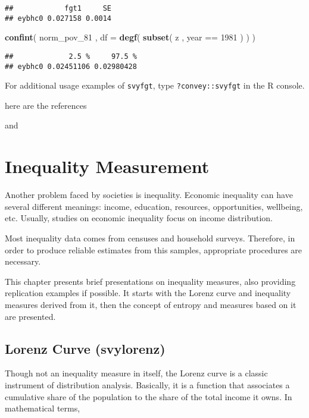 \documentclass[]{book}
\newenvironment{Shaded}{\begin{snugshade}}{\end{snugshade}}
\newcommand{\KeywordTok}[1]{\textcolor[rgb]{0.13,0.29,0.53}{\textbf{{#1}}}}
\newcommand{\DataTypeTok}[1]{\textcolor[rgb]{0.13,0.29,0.53}{{#1}}}
\newcommand{\DecValTok}[1]{\textcolor[rgb]{0.00,0.00,0.81}{{#1}}}
\newcommand{\StringTok}[1]{\textcolor[rgb]{0.31,0.60,0.02}{{#1}}}
\newcommand{\NormalTok}[1]{{#1}}
\theoremstyle{definition}
\theoremstyle{definition}
\theoremstyle{remark}
\begin{document}
\begin{verbatim}
##            fgt1     SE
## eybhc0 0.027158 0.0014
\end{verbatim}

\begin{Shaded}
\begin{Highlighting}[]
\KeywordTok{confint}\NormalTok{( norm_pov_81 , }\DataTypeTok{df =} \KeywordTok{degf}\NormalTok{( }\KeywordTok{subset}\NormalTok{( z , year ==}\StringTok{ }\DecValTok{1981} \NormalTok{) ) )}
\end{Highlighting}
\end{Shaded}

\begin{verbatim}
##             2.5 %     97.5 %
## eybhc0 0.02451106 0.02980428
\end{verbatim}

For additional usage examples of \texttt{svyfgt}, type
\texttt{?convey::svyfgt} in the R console.

here are the references

\citep{foster1984} and \citep{berger2003}

\chapter{Inequality Measurement}\label{inequality}

Another problem faced by societies is inequality. Economic inequality
can have several different meanings: income, education, resources,
opportunities, wellbeing, etc. Usually, studies on economic inequality
focus on income distribution.

Most inequality data comes from censuses and household surveys.
Therefore, in order to produce reliable estimates from this samples,
appropriate procedures are necessary.

This chapter presents brief presentations on inequality measures, also
providing replication examples if possible. It starts with the Lorenz
curve and inequality measures derived from it, then the concept of
entropy and measures based on it are presented.

\section{Lorenz Curve (svylorenz)}\label{lorenz-curve-svylorenz}

Though not an inequality measure in itself, the Lorenz curve is a
classic instrument of distribution analysis. Basically, it is a function
that associates a cumulative share of the population to the share of the
total income it owns. In mathematical terms,
\end{document}
